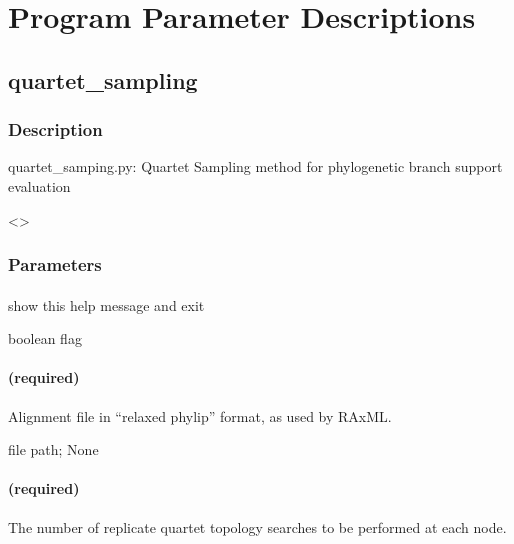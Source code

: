 \documentclass[letterpaper,12pt,english]{sphinxmanual}
\begin{document}
\chapter{Program Parameter Descriptions}
\label{\detokenize{prog_desc:program-parameter-descriptions}}\label{\detokenize{prog_desc::doc}}

\section{quartet\_sampling}
\label{\detokenize{prog_desc:quartet-sampling}}

\subsection{Description}
\label{\detokenize{prog_desc:description}}
quartet\_samping.py: Quartet Sampling method for
phylogenetic branch support evaluation

\textless{}\textgreater{}


\subsection{Parameters}
\label{\detokenize{prog_desc:parameters}}

\subsubsection{}
\label{\detokenize{prog_desc:h-help}}
 show this help message and exit

 boolean flag


\subsubsection{ (required)}
\label{\detokenize{prog_desc:align-alignment-required}}
 Alignment file in “relaxed phylip” format, as used by RAxML.

 file path;  None


\subsubsection{ (required)}
\label{\detokenize{prog_desc:reps-number-of-reps-required}}
 The number of replicate quartet topology searches to be performed at each node.
\end{document}
